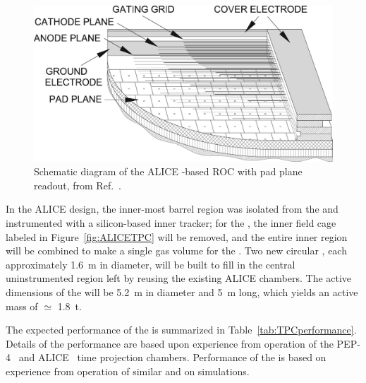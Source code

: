 \begin{figure}[h]
    \centering
    \includegraphics{graphics/TPC_ROC_MWPC.jpg}
    \caption{Schematic diagram of the ALICE -based ROC with pad plane readout, from Ref.~\cite{Alme:2010ke}.}
    \label{fig:ALICE_ROC_MWPC}
\end{figure}

In the ALICE design, the inner-most barrel region was isolated from the  and instrumented with a silicon-based inner tracker; for the  , the inner field cage labeled in Figure~\ref{fig:ALICETPC} will be removed, and the entire inner region will be combined to make a single gas volume for the . Two new circular , each approximately \SI{1.6}{m} in diameter, will be built to fill in the central uninstrumented region left by reusing the existing ALICE chambers.  The active dimensions of the  will be \SI{5.2}{m} in diameter and \SI{5}{m} long, which yields an active mass of $\simeq$ \SI{1.8}{t}. 

The expected performance of the  is summarized in Table~\ref{tab:TPCperformance}. Details of the  performance are based upon experience from operation of the PEP-4~\cite{PEP4_results_Layter,PEP4_Stork,Madaras:1982cj} and ALICE~\cite{Alessandro:2006yt} time projection chambers. Performance of the  is based on experience from operation of similar  and on simulations. 

